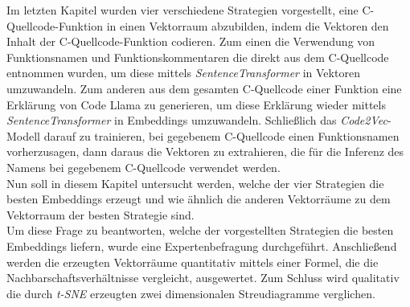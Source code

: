 \documentclass[12pt,letterpaper,ngerman]{article}
\begin{document}
Im letzten Kapitel wurden vier verschiedene Strategien vorgestellt,
eine C-Quellcode-Funktion in einen Vektorraum abzubilden, indem 
die Vektoren den Inhalt der C-Quellcode-Funktion codieren.
Zum einen die Verwendung von Funktionsnamen und Funktionskommentaren 
die direkt aus dem C-Quellcode entnommen wurden, um diese mittels
\textit{SentenceTransformer} in Vektoren umzuwandeln. Zum anderen
aus dem gesamten C-Quellcode einer
Funktion eine Erklärung von Code Llama zu generieren, um diese 
Erklärung wieder mittels \textit{SentenceTransformer} in Embeddings
umzuwandeln. Schließlich das \textit{Code2Vec}-Modell darauf zu
trainieren,
bei gegebenem C-Quellcode einen Funktionsnamen vorherzusagen, dann 
daraus die Vektoren zu extrahieren, die für die Inferenz des Namens
bei gegebenem C-Quellcode verwendet werden.\\
Nun soll in diesem Kapitel untersucht werden, welche der vier 
Strategien
die besten Embeddings erzeugt und wie ähnlich die anderen 
Vektorräume zu dem Vektorraum der besten Strategie
sind.\\
Um diese Frage zu beantworten, welche der vorgestellten Strategien
die besten Embeddings liefern, wurde eine Expertenbefragung 
durchgeführt. Anschließend werden die erzeugten Vektorräume quantitativ
mittels einer Formel, die die Nachbarschaftsverhältnisse vergleicht, 
ausgewertet.
Zum Schluss wird qualitativ die durch \textit{t-SNE} erzeugten
zwei dimensionalen Streudiagramme verglichen.
\end{document}
